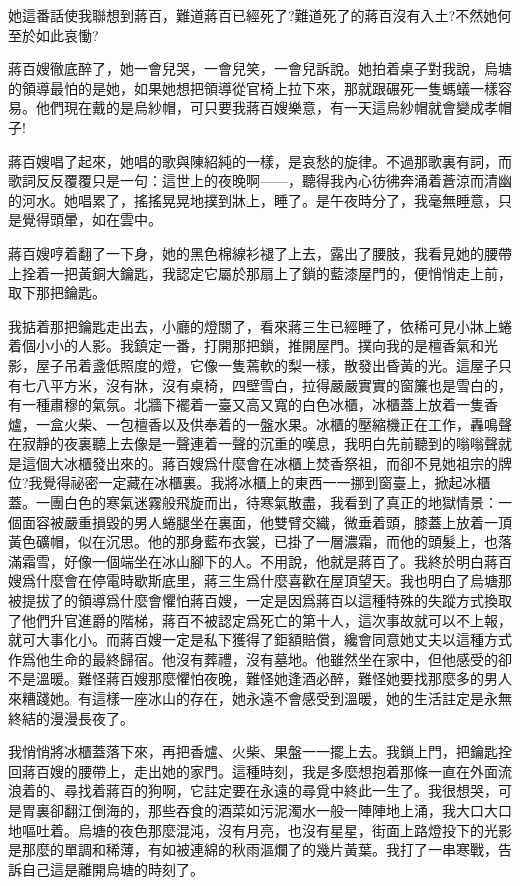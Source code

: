 \documentclass[a6paper]{article}
\begin{document}
她這番話使我聯想到蔣百，難道蔣百已經死了?難道死了的蔣百沒有入土?不然她何至於如此哀慟?

蔣百嫂徹底醉了，她一會兒哭，一會兒笑，一會兒訴說。她拍着桌子對我說，烏塘的領導最怕的是她，如果她想把領導從官椅上拉下來，那就跟碾死一隻螞蟻一樣容易。他們現在戴的是烏紗帽，可只要我蔣百嫂樂意，有一天這烏紗帽就會變成孝帽子!

蔣百嫂唱了起來，她唱的歌與陳紹純的一樣，是哀愁的旋律。不過那歌裏有詞，而歌詞反反覆覆只是一句：這世上的夜晚啊——，聽得我內心彷彿奔涌着蒼涼而清幽的河水。她唱累了，搖搖晃晃地撲到牀上，睡了。是午夜時分了，我毫無睡意，只是覺得頭暈，如在雲中。

蔣百嫂哼着翻了一下身，她的黑色棉線衫褪了上去，露出了腰肢，我看見她的腰帶上拴着一把黃銅大鑰匙，我認定它屬於那扇上了鎖的藍漆屋門的，便悄悄走上前，取下那把鑰匙。

我掂着那把鑰匙走出去，小廳的燈關了，看來蔣三生已經睡了，依稀可見小牀上蜷着個小小的人影。我鎮定一番，打開那把鎖，推開屋門。撲向我的是檀香氣和光影，屋子吊着盞低照度的燈，它像一隻蔫軟的梨一樣，散發出昏黃的光。這屋子只有七八平方米，沒有牀，沒有桌椅，四壁雪白，拉得嚴嚴實實的窗簾也是雪白的，有一種肅穆的氣氛。北牆下襬着一臺又高又寬的白色冰櫃，冰櫃蓋上放着一隻香爐，一盒火柴、一包檀香以及供奉着的一盤水果。冰櫃的壓縮機正在工作，轟鳴聲在寂靜的夜裏聽上去像是一聲連着一聲的沉重的嘆息，我明白先前聽到的嗡嗡聲就是這個大冰櫃發出來的。蔣百嫂爲什麼會在冰櫃上焚香祭祖，而卻不見她祖宗的牌位?我覺得祕密一定藏在冰櫃裏。我將冰櫃上的東西一一挪到窗臺上，掀起冰櫃蓋。一團白色的寒氣迷霧般飛旋而出，待寒氣散盡，我看到了真正的地獄情景：一個面容被嚴重損毀的男人蜷腿坐在裏面，他雙臂交織，微垂着頭，膝蓋上放着一頂黃色礦帽，似在沉思。他的那身藍布衣裳，已掛了一層濃霜，而他的頭髮上，也落滿霜雪，好像一個端坐在冰山腳下的人。不用說，他就是蔣百了。我終於明白蔣百嫂爲什麼會在停電時歇斯底里，蔣三生爲什麼喜歡在屋頂望天。我也明白了烏塘那被提拔了的領導爲什麼會懼怕蔣百嫂，一定是因爲蔣百以這種特殊的失蹤方式換取了他們升官進爵的階梯，蔣百不被認定爲死亡的第十人，這次事故就可以不上報，就可大事化小。而蔣百嫂一定是私下獲得了鉅額賠償，纔會同意她丈夫以這種方式作爲他生命的最終歸宿。他沒有葬禮，沒有墓地。他雖然坐在家中，但他感受的卻不是溫暖。難怪蔣百嫂那麼懼怕夜晚，難怪她逢酒必醉，難怪她要找那麼多的男人來糟踐她。有這樣一座冰山的存在，她永遠不會感受到溫暖，她的生活註定是永無終結的漫漫長夜了。

我悄悄將冰櫃蓋落下來，再把香爐、火柴、果盤一一擺上去。我鎖上門，把鑰匙拴回蔣百嫂的腰帶上，走出她的家門。這種時刻，我是多麼想抱着那條一直在外面流浪着的、尋找着蔣百的狗啊，它註定要在永遠的尋覓中終此一生了。我很想哭，可是胃裏卻翻江倒海的，那些吞食的酒菜如污泥濁水一般一陣陣地上涌，我大口大口地嘔吐着。烏塘的夜色那麼混沌，沒有月亮，也沒有星星，街面上路燈投下的光影是那麼的單調和稀薄，有如被連綿的秋雨漚爛了的幾片黃葉。我打了一串寒戰，告訴自己這是離開烏塘的時刻了。
\end{document}
